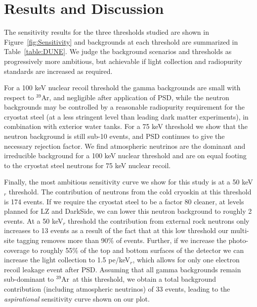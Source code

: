 \documentclass[a4paper,11pt]{article}
\newcommand{\artn}{$^{39}$Ar}
\begin{document}
\section{Results and Discussion}

 The sensitivity results for the three thresholds studied are shown in Figure~\ref{fig:Sensitivity} and backgrounds at each threshold are summarized in Table~\ref{table:DUNE}. We judge the background scenarios and thresholds as progressively more ambitious, but  achievable if light collection and radiopurity standards are increased as required. 
 
 For a 100 keV nuclear recoil threshold the gamma backgrounds are small with respect to \artn, and negligible after application of PSD, while the neutron backgrounds may be controlled by a reasonable radiopurity requirement for the cryostat steel (at a less stringent level than leading dark matter experiments), in combination with exterior water tanks. For a 75 keV threshold we show that the neutron background is still sub-10 events, and PSD continues to give the necessary rejection factor. We find  atmospheric neutrinos are the dominant and irreducible background for a 100 keV nuclear threshold and are on equal footing to the cryostat steel neutrons for 75 keV nuclear recoil.

Finally, the most ambitious sensitivity curve we show for this study is at a 50 keV$_r$ threshold.  The contribution of neutrons from the cold cryoskin at this threshold is 174 events. If we require the cryostat steel to be a factor 80 cleaner, at levels planned for LZ and DarkSide, we can lower this neutron background to roughly 2 events. At a 50 keV$_r$ threshold the contribution from external rock neutrons only increases to 13 events as a result of the fact that at this low threshold our multi-site tagging removes more than 90\% of events. Further, if we increase the photo-coverage to roughly 55\% of the top and bottom surfaces of the detector we can increase the light collection to 1.5 pe/keV$_r$, which allows for only one electron recoil leakage event after PSD. Assuming that all gamma backgrounds remain sub-dominant to \artn~at this threshold, we obtain a total background contribution (including atmospheric neutrinos) of 33 events, leading to the {\em aspirational} sensitivity curve shown on our plot.
\end{document}
